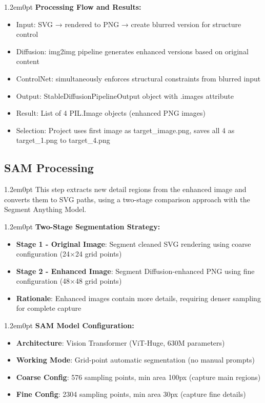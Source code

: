 \documentclass[10pt,a4paper]{article}
\newenvironment{bodytext}{\begin{adjustwidth}{1.2em}{0pt}}{\end{adjustwidth}}
\begin{document}
\begin{bodytext}
\textbf{Processing Flow and Results:}
\begin{itemize}
\item Input: SVG → rendered to PNG → create blurred version for structure control
\item Diffusion: img2img pipeline generates enhanced versions based on original content
\item ControlNet: simultaneously enforces structural constraints from blurred input
\item Output: StableDiffusionPipelineOutput object with .images attribute
\item Result: List of 4 PIL.Image objects (enhanced PNG images)
\item Selection: Project uses first image as target\_image.png, saves all 4 as target\_1.png to target\_4.png
\end{itemize}
\end{bodytext}

\subsection{SAM Processing}

\begin{bodytext}
This step extracts new detail regions from the enhanced image and converts them to SVG paths, using a two-stage comparison approach with the Segment Anything Model.
\end{bodytext}

\begin{bodytext}
\textbf{Two-Stage Segmentation Strategy:}
\begin{itemize}
\item \textbf{Stage 1 - Original Image}: Segment cleaned SVG rendering using coarse configuration (24×24 grid points)
\item \textbf{Stage 2 - Enhanced Image}: Segment Diffusion-enhanced PNG using fine configuration (48×48 grid points)
\item \textbf{Rationale}: Enhanced images contain more details, requiring denser sampling for complete capture
\end{itemize}
\end{bodytext}

\begin{bodytext}
\textbf{SAM Model Configuration:}
\begin{itemize}
\item \textbf{Architecture}: Vision Transformer (ViT-Huge, 630M parameters)
\item \textbf{Working Mode}: Grid-point automatic segmentation (no manual prompts)
\item \textbf{Coarse Config}: 576 sampling points, min area 100px (capture main regions)
\item \textbf{Fine Config}: 2304 sampling points, min area 30px (capture fine details)
\end{itemize}
\end{bodytext}
\end{document}

